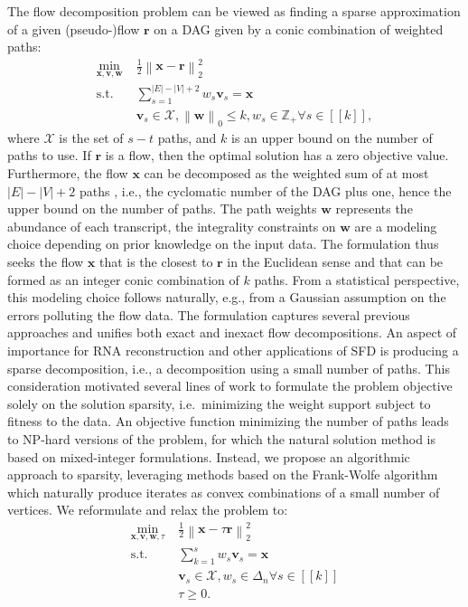 \documentclass{ecai}
\newcommand{\norm}[1]{\left\| #1 \right\|}
\newcommand{\vx}{\mathbf{x}}
\newcommand{\vvv}{\mathbf{v}}
\newcommand{\vw}{\mathbf{w}}
\newcommand{\vr}{\mathbf{r}}
\newcommand{\Z}{\mathbb{Z}}
\newcommand{\Xset}{{\ensuremath{\mathcal{X}}}\xspace}
\newcommand{\interval}[1]{ [\![  #1 ]\!]}
\begin{document}
The flow decomposition problem can be viewed as finding a sparse approximation of a given (pseudo-)flow $\vr$ on a DAG given by a conic combination of weighted paths:
\begin{align*}
\min_{\vx, \vvv, \vw}\;& \frac12 \norm{\vx - \vr}^2_2 \\
\text{s.t. } & \sum_{s=1}^{|E| - |V| + 2} w_s \vvv_s = \vx \\
& \vvv_s \in \Xset{}, \norm{\vw}_0 \leq k, w_s \in \Z_+ \forall s \in \interval{k},
\end{align*}
where $\Xset{}$ is the set of $s-t$ paths, and $k$ is an upper bound on the number of paths to use.
If $\vr$ is a flow, then the optimal solution has a zero objective value.
Furthermore, the flow $\vx$ can be decomposed as the weighted sum of at most $|E|- |V| + 2$ paths \cite{vatinlen2008simple}, i.e., the cyclomatic number of the DAG plus one, hence the upper bound on the number of paths.
The path weights $\vw$ represents the abundance of each transcript, the integrality constraints on $\vw$ are a modeling choice depending on prior knowledge on the input data.
The formulation thus seeks the flow $\vx$ that is the closest to $\vr$ in the Euclidean sense and that can be formed as an integer conic combination of $k$ paths.
From a statistical perspective, this modeling choice follows naturally, e.g., from a Gaussian assumption on the errors polluting the flow data.
The formulation captures several previous approaches \cite{tomescu2015explaining,williams2019rna,dias2022efficient} and unifies both exact and inexact flow decompositions.
An aspect of importance for RNA reconstruction and other applications of SFD is producing a sparse decomposition, i.e., a decomposition using a small number of paths.
This consideration motivated several lines of work to formulate the problem objective solely on the solution sparsity, i.e.~minimizing the weight support subject to fitness to the data.
An objective function minimizing the number of paths leads to NP-hard versions of the problem, for which the natural solution method is based on mixed-integer formulations.
Instead, we propose an algorithmic approach to sparsity, leveraging methods based on the Frank-Wolfe algorithm which naturally produce iterates as convex combinations of a small number of vertices.
We reformulate and relax the problem to:
\begin{align*}
\min_{\vx, \vvv, \vw, \tau}\;& \frac12 \norm{\vx - \tau \vr}^2_2 \\
\text{s.t. } & \sum_{k=1}^{s} w_s \vvv_s = \vx\\
& \vvv_s \in \Xset{}, w_s \in \Delta_n \forall s \in \interval{k} \\
& \tau \geq 0.
\end{align*}
\end{document}
